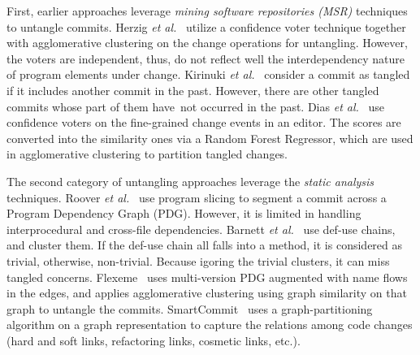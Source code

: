 First, earlier approaches leverage {\em mining software repositories
  (MSR)} techniques to untangle commits. Herzig {\em et
  al.}~\cite{kim-msr13,kim-emse16} utilize a confidence voter
technique together with agglomerative clustering on the change
operations for untangling.
However, the voters are independent, thus, do not reflect well the
interdependency nature of program elements under change.
%
Kirinuki {\em et al.}~\cite{higo-apsec16, higo-icpc14} consider a
commit as tangled if it includes another commit in the past. However,
there are other tangled commits whose part of them have~not occurred
in the past.
%
Dias {\em et al.}~\cite{dias-saner15} use confidence voters
on the fine-grained change events in an editor. The scores are con\-verted
into the similarity ones via a Random Forest Regressor, which are used
in agglomerative clustering to partition tangled changes.

The second category of untangling approaches leverage the {\em static
  analysis} techniques. Roover {\em et al.}~\cite{roover-scam18} use
program slicing to segment a commit across a Program Dependency Graph
(PDG).  However, it is limited in handling interprocedural and
cross-file dependencies. Barnett {\em et al.}~\cite{barnett-icse15}
use def-use chains, and cluster them. If the def-use chain all falls
into a method, it is considered as trivial, otherwise,
non-trivial. Because igoring the trivial clusters, it can miss tangled
concerns. Flexeme~\cite{flexeme-fse20} uses multi-version PDG
augmented with name flows in the edges, and applies agglomerative
clustering using graph similarity on that graph to untangle the
commits. SmartCommit~\cite{smartcommit-fse21} uses a
graph-partitioning algorithm on a graph representation to capture the
relations among code changes (hard and soft links, refactoring links,
cosmetic links, etc.).


